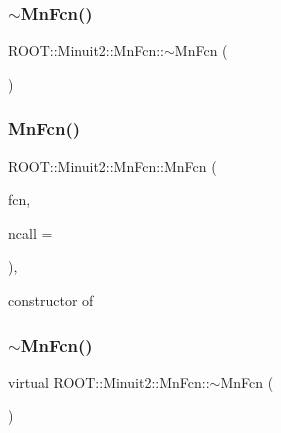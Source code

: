 \subsubsection{\texorpdfstring{$\sim$MnFcn()}{~MnFcn()}\hspace{0.1cm}{\footnotesize\ttfamily [1/3]}}
{\footnotesize\ttfamily R\+O\+O\+T\+::\+Minuit2\+::\+Mn\+Fcn\+::$\sim$\+Mn\+Fcn (\begin{DoxyParamCaption}{ }\end{DoxyParamCaption})\hspace{0.3cm}{\ttfamily [virtual]}}

\mbox{\label{classROOT_1_1Minuit2_1_1MnFcn_a882c5c26556515b2bbe0d07f50b32f4f}} 
\subsubsection{\texorpdfstring{MnFcn()}{MnFcn()}\hspace{0.1cm}{\footnotesize\ttfamily [2/3]}}
{\footnotesize\ttfamily R\+O\+O\+T\+::\+Minuit2\+::\+Mn\+Fcn\+::\+Mn\+Fcn (\begin{DoxyParamCaption}\item[{const \mbox{\hyperlink{classROOT_1_1Minuit2_1_1FCNBase}{F\+C\+N\+Base}} \&}]{fcn,  }\item[{int}]{ncall = {} }\end{DoxyParamCaption})\hspace{0.3cm}{\ttfamily [inline]}, {\ttfamily [explicit]}}



constructor of 

\mbox{\label{classROOT_1_1Minuit2_1_1MnFcn_af4e4b9979af77ae593ceea7e7db82e2d}} 
\subsubsection{\texorpdfstring{$\sim$MnFcn()}{~MnFcn()}\hspace{0.1cm}{\footnotesize\ttfamily [2/3]}}
{\footnotesize\ttfamily virtual R\+O\+O\+T\+::\+Minuit2\+::\+Mn\+Fcn\+::$\sim$\+Mn\+Fcn (\begin{DoxyParamCaption}{ }\end{DoxyParamCaption})\hspace{0.3cm}{\ttfamily [virtual]}}


